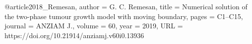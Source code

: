 @article{2018_Remesan,
  author    = {G. C. Remesan},
  title     = {Numerical solution of the two-phase tumour growth model with moving boundary},
  pages     = {C1--C15},
  journal   =  {ANZIAM J.},
  volume    = {60},
  year      = {2019},
URL  = {https://doi.org/10.21914/anziamj.v60i0.13936}
}